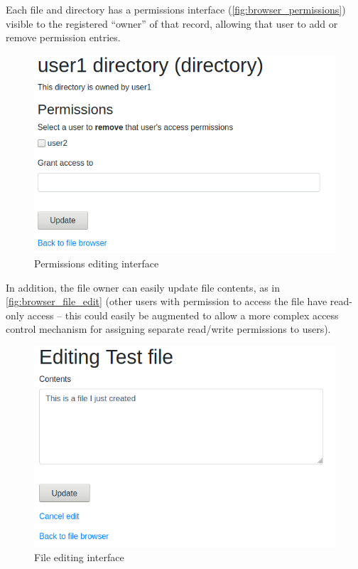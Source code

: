 \documentclass[12pt]{report}
\begin{document}
Each file and directory has a permissions interface (\autoref{fig:browser_permissions}) visible to the registered ``owner'' of that record, allowing that user to add or remove permission entries.

\begin{figure}[ht]
  \begin{center}
    \includegraphics[scale=0.5]{06-browser2-perms.png}
  \end{center}
  \caption{Permissions editing interface}
  \label{fig:browser_permissions}
\end{figure}

In addition, the file owner can easily update file contents, as in \autoref{fig:browser_file_edit} (other users with permission to access the file have read-only access -- this could easily be augmented to allow a more complex access control mechanism for assigning separate read/write permissions to users).

\begin{figure}[ht]
  \begin{center}
    \includegraphics[scale=0.5]{07-browser3-file-contents.png}
  \end{center}
  \caption{File editing interface}
  \label{fig:browser_file_edit}
\end{figure}
\end{document}
